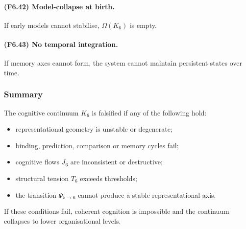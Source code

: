 \paragraph{(F6.42) Model-collapse at birth.}
If early models cannot stabilise,
$\Omega(K_6)$ is empty.

\paragraph{(F6.43) No temporal integration.}
If memory axes cannot form,
the system cannot maintain persistent states over time.



\subsubsection{Summary}

The cognitive continuum $K_6$ is falsified if any of the following hold:

\begin{itemize}
    \item representational geometry is unstable or degenerate;
    \item binding, prediction, comparison or memory cycles fail;
    \item cognitive flows $J_6$ are inconsistent or destructive;
    \item structural tension $T_6$ exceeds thresholds;
    \item the transition $\Psi_{5\to 6}$ cannot produce a stable
          representational axis.
\end{itemize}

If these conditions fail, coherent cognition is impossible and the
continuum collapses to lower organisational levels.
